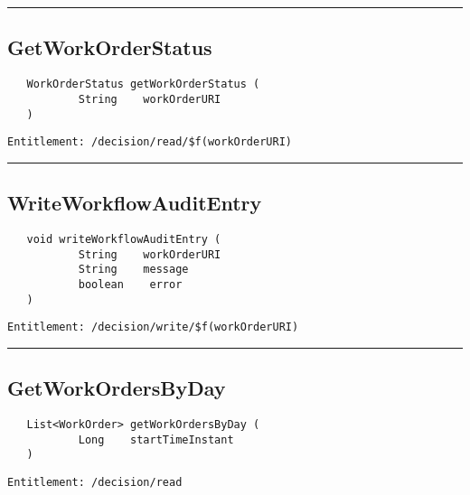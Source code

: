 \rule{12cm}{2pt}
\subsection{GetWorkOrderStatus}
\label{Api:GetWorkOrderStatus}
\begin{verbatim}
   WorkOrderStatus getWorkOrderStatus (
           String    workOrderURI
   )
\end{verbatim}
\begin{Verbatim}[fontsize=\small, formatcom=\color{Maroon}]
  Entitlement: /decision/read/$f(workOrderURI)
\end{Verbatim}



\rule{12cm}{2pt}
\subsection{WriteWorkflowAuditEntry}
\label{Api:WriteWorkflowAuditEntry}
\begin{verbatim}
   void writeWorkflowAuditEntry (
           String    workOrderURI
           String    message
           boolean    error
   )
\end{verbatim}
\begin{Verbatim}[fontsize=\small, formatcom=\color{Maroon}]
  Entitlement: /decision/write/$f(workOrderURI)
\end{Verbatim}



\rule{12cm}{2pt}
\subsection{GetWorkOrdersByDay}
\label{Api:GetWorkOrdersByDay}
\begin{verbatim}
   List<WorkOrder> getWorkOrdersByDay (
           Long    startTimeInstant
   )
\end{verbatim}
\begin{Verbatim}[fontsize=\small, formatcom=\color{Maroon}]
  Entitlement: /decision/read
\end{Verbatim}



